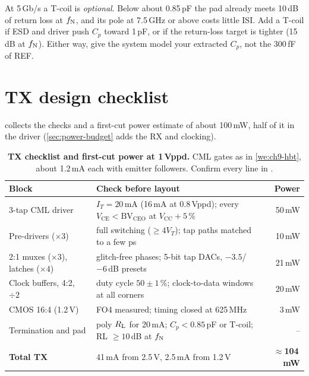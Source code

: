\begin{insight}
At 5\,Gb/s a T-coil is \emph{optional}. Below about 0.85\,pF the pad already meets 10\,dB of return loss at $f_\mathrm{N}$, and its pole at 7.5\,GHz or above costs little ISI. Add a T-coil if ESD and driver push $C_p$ toward 1\,pF, or if the return-loss target is tighter (15\,dB at $f_\mathrm{N}$). Either way, give the system model your extracted $C_p$, not the 300\,fF of REF.
\end{insight}

\section{TX design checklist}\label{sec:ch9-checklist}

 collects the checks and a first-cut power estimate of about 100\,mW, half of it in the driver (\cref{sec:power-budget} adds the RX and clocking).

\begin{table}[tbp]
\centering
\caption{\textbf{TX checklist and first-cut power at 1\,Vppd.} CML gates as in \cref{we:ch9-hbt}, about 1.2\,mA each with emitter followers. Confirm every line in .}
\label{tab:ch9-check}
\small
\begin{tabularx}{\linewidth}{@{}l L r@{}}
\toprule
Block & Check before layout & Power\\
-tap CML driver & $I_T=20$\,mA (16\,mA at 0.8\,Vppd); every $V_\mathrm{CE}<\mathrm{BV}_\mathrm{CEO}$ at $V_\mathrm{CC}+5\,\%$ & 50\,mW\\
Pre-drivers ($\times3$) & full switching ($\ge4V_T$); tap paths matched to a few ps & 10\,mW\\
2:1 muxes ($\times3$), latches ($\times4$) & glitch-free phases; 5-bit tap DACs, $-3.5$/$-6$\,dB presets & 21\,mW\\
Clock buffers, 4:2, $\div2$ & duty cycle $50\pm1\,\%$; clock-to-data windows at all corners & 20\,mW\\
CMOS 16:4 (1.2\,V) & FO4 measured; timing closed at 625\,MHz & 3\,mW\\
Termination and pad & poly $R_\mathrm{L}$ for 20\,mA; $C_p<0.85$\,pF or T-coil; RL $\ge10$\,dB at $f_\mathrm{N}$ & --\\
\midrule
\textbf{Total TX} & 41\,mA from 2.5\,V, 2.5\,mA from 1.2\,V & \textbf{$\approx$104\,mW}\\
\bottomrule
\end{tabularx}
\end{table}


